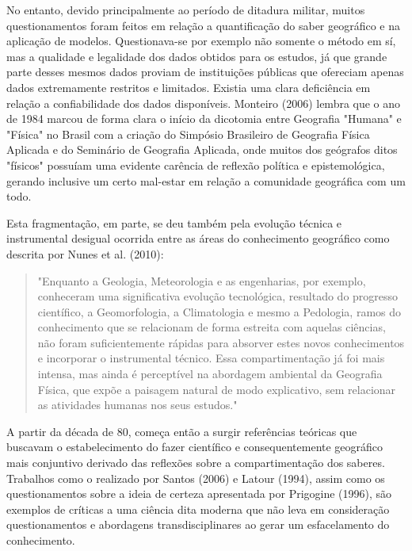 No entanto, devido principalmente ao período de ditadura militar, muitos questionamentos foram feitos em relação a quantificação do saber geográfico e na aplicação de modelos. Questionava-se por exemplo não somente o método em sí, mas a qualidade e legalidade dos dados obtidos para os estudos, já que grande parte desses mesmos dados proviam de instituições públicas que ofereciam apenas dados extremamente restritos e limitados. Existia uma clara deficiência em relação a confiabilidade dos dados disponíveis. Monteiro (2006)\cite{MONTEIRO_06} lembra que o ano de 1984 marcou de forma clara o início da dicotomia entre Geografia "Humana" e "Física" no Brasil com a criação do Simpósio Brasileiro de Geografia Física Aplicada e do Seminário de Geografia Aplicada, onde muitos dos geógrafos ditos "físicos" possuíam uma evidente carência de reflexão política e epistemológica, gerando inclusive um certo mal-estar em relação a comunidade geográfica com um todo.

Esta fragmentação, em parte, se deu também pela evolução técnica e instrumental desigual ocorrida entre as áreas do conhecimento geográfico como descrita por Nunes et al. (2010):	
	
	\begin{quote}
		"Enquanto a Geologia, Meteorologia e as engenharias, por exemplo, conheceram uma significativa evolução tecnológica, resultado do progresso científico, a Geomorfologia, a Climatologia e mesmo a Pedologia, ramos do conhecimento que se relacionam de forma estreita com aquelas ciências, não foram suficientemente rápidas para absorver estes novos conhecimentos e incorporar o instrumental técnico.
		Essa compartimentação já foi mais intensa, mas ainda é perceptível na abordagem ambiental da Geografia Física, que expõe a paisagem natural de modo explicativo, sem relacionar as atividades humanas nos seus estudos."
	\end{quote}

A partir da década de 80, começa então a surgir referências teóricas que buscavam o estabelecimento do fazer científico e consequentemente geográfico mais conjuntivo derivado das reflexões sobre a compartimentação dos saberes. Trabalhos como o realizado por Santos (2006)\cite{SANTOS_06} e Latour (1994)\cite{LATOUR}, assim como os questionamentos sobre a ideia de certeza apresentada por Prigogine (1996)\cite{PRIGOGINE}, são exemplos de críticas a uma ciência dita moderna que não leva em consideração questionamentos e abordagens transdisciplinares ao gerar um esfacelamento do conhecimento.

